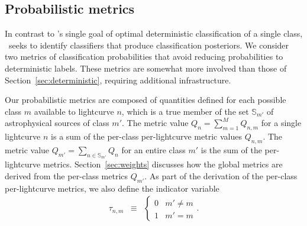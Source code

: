


\subsection{Probabilistic metrics}
\label{sec:probabilistic}

In contrast to \snphotcc's single goal of optimal deterministic classification of a single class, \plasticc\ seeks to identify classifiers that produce classification posteriors.
We consider two metrics of classification probabilities that avoid reducing probabilities to deterministic labels.
These metrics are somewhat more involved than those of Section~\ref{sec:deterministic}, requiring additional infrastructure.

Our probabilistic metrics are composed of quantities defined for each possible class $m$ available to lightcurve $n$, which is a true member of the set $\mathbb{S}_{m'}$ of astrophysical sources of class $m'$.
The metric value $Q_{n} = \sum_{m=1}^{M} Q_{n, m}$ for a single lightcurve $n$ is a sum of the per-class per-lightcurve metric values $Q_{n, m}$.
The metric value $Q_{m'} = \sum_{n \in \mathbb{S}_{m'}} Q_{n}$ for an entire class $m'$ is the sum of the per-lightcurve metrics.
Section~\ref{sec:weights} discusses how the global metrics are derived from the per-class metrics $Q_{m'}$.
As part of the derivation of the per-class per-lightcurve metrics, we also define the indicator variable
\begin{eqnarray}
  \label{eq:indicator}
  \tau_{n, m} &\equiv& \begin{cases}
  0 & m' \neq m\\
  1 & m' = m
  \end{cases}.
\end{eqnarray}


